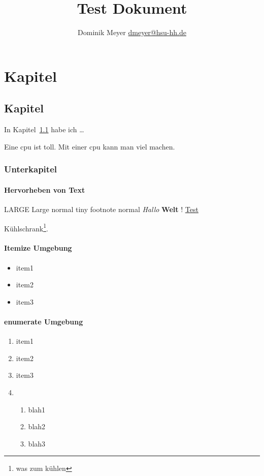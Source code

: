\documentclass{scrbook}
\title{Test Dokument}
\author{Dominik Meyer \url{dmeyer@hsu-hh.de}}
\begin{document}
\maketitle
\newpage
\printglossary[type=\acronymtype,title=acronyms,style=long]
\listoffigures
\listoftables
\tableofcontents

\chapter{Kapitel}
\section{Kapitel}
\label{chap:kapitel:kapitel}

In Kapitel~\ref{chap:kapitel:kapitel} habe ich \ldots

Eine \gls{cpu} ist toll. Mit einer \gls{cpu} kann man viel machen.
\subsection{Unterkapitel}
\subsubsection{Hervorheben von Text}
\LARGE LARGE
\Large Large
\normalsize normal
\tiny tiny
\footnotesize footnote
\normalsize normal
\emph{Hallo} \textbf{Welt} ! \underline{Test}

Kühlschrank\footnote{was zum kühlen}.

\subsubsection{Itemize Umgebung}
\begin{itemize}
  \item item1
  \item item2
  \item item3
\end{itemize}

\subsubsection{enumerate Umgebung}

\begin{enumerate}
  \item item1
  \item item2
  \item item3
  \item \begin{enumerate}
    \item blah1
    \item blah2
    \item blah3
  \end{enumerate}
\end{enumerate}
\end{document}
